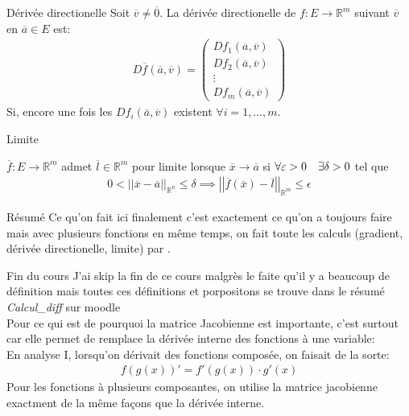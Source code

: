 \begin{parag}{Dérivée directionelle}
    Soit $\overline{v} \neq \overline{0}$. La dérivée directionelle de $f : E \to \mathbb{R}^{m}$ suivant $\overline{v}$ en $\overline{a} \in E$ est:
    \begin{align*} D\overline{f}\left(\overline{a}, \overline{v}\right)= \begin{pmatrix} Df_1\left(\overline{a}, \overline{v}\right) \\ Df_2\left(\overline{a}, \overline{v}\right)  \\ \vdots \\ Df_m\left(\overline{a}, \overline{v}\right) \end{pmatrix}  \end{align*}
    Si, encore une fois les $Df_i\left(\overline{a}, \overline{v}\right)$ existent $\forall i = 1, \ldots, m$.
\end{parag}
\begin{parag}{Limite}
    \begin{definition}
          $\overline{f}: E \to \mathbb{R}^{m}$ admet $\overline{l} \in \mathbb{R}^{m}$ pour limite lorsque $\overline{x} \to \overline{a}$ si $\forall \varepsilon > 0 \quad \exists \delta > 0$ tel que
	  \begin{align*} 
		  0 < \left|\left|\overline{x} - \overline{a}\right|\right|_{\mathbb{R}^{n}} \leq \delta \implies \left|\left|\overline{f}\left(\overline{x}\right) - \overline{l}\right|\right|_{\mathbb{R}^{m}} \leq \epsilon
	  \end{align*}
    \end{definition}
\end{parag}
\begin{parag}{Résumé}
    Ce qu'on fait ici finalement c'est exactement ce qu'on a toujours faire mais avec plusieurs fonctions en même temps, on fait toute les calculs (gradient, dérivée directionelle, limite) par .
\end{parag}
\begin{parag}{Fin du cours}
	J'ai skip la fin de ce cours malgrès le faite qu'il y a beaucoup de définition mais toutes ces définitions et porpositons se trouve dans le résumé \textit{Calcul\_diff} sur moodle\\
	Pour ce qui est de pourquoi la matrice Jacobienne est importante, c'est surtout car elle permet de remplace la dérivée interne des fonctions à une variable:\\
        En analyse I, lorsqu'on dérivait des fonctions composée, on faisait de la sorte:
	\begin{align*} f\left(g\left(x\right)\right)' = f'\left(g\left(x\right)\right) \cdot  g'\left(x\right) \end{align*}
	Pour les fonctions à plusieurs composantes, on utilise la matrice jacobienne exactment de la même façons que la dérivée interne.
\end{parag}







